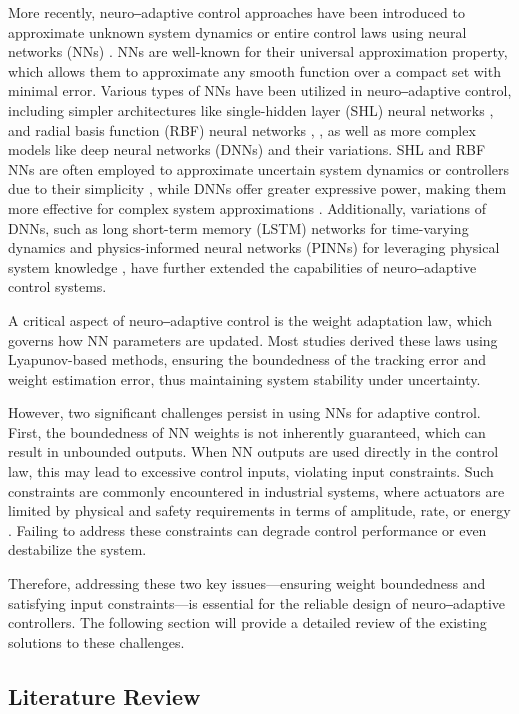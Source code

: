 \documentclass[lettersize,journal]{IEEEtran}
\begin{document}
More recently, neuro‒adaptive control approaches have been introduced to approximate unknown system dynamics or entire control laws using neural networks (NNs) \cite{RN1}. NNs are well-known for their universal approximation property, which allows them to approximate any smooth function over a compact set with minimal error. Various types of NNs have been utilized in neuro‒adaptive control, including simpler architectures like single-hidden layer (SHL) neural networks \cite{RN29}, \cite{RN44} and radial basis function (RBF) neural networks \cite{RN26}, \cite{RN10}, as well as more complex models like deep neural networks (DNNs) \cite{RN16} and their variations. SHL and RBF NNs are often employed to approximate uncertain system dynamics or controllers due to their simplicity \cite{RN44, RN56, RN3, RN41}, while DNNs offer greater expressive power, making them more effective for complex system approximations \cite{RN25}. Additionally, variations of DNNs, such as long short-term memory (LSTM) networks for time-varying dynamics \cite{RN14} and physics-informed neural networks (PINNs) for leveraging physical system knowledge \cite{RN15}, have further extended the capabilities of neuro‒adaptive control systems.

A critical aspect of neuro‒adaptive control is the weight adaptation law, which governs how NN parameters are updated. Most studies derived these laws using Lyapunov-based methods, ensuring the boundedness of the tracking error and weight estimation error, thus maintaining system stability under uncertainty.

However, two significant challenges persist in using NNs for adaptive control. First, the boundedness of NN weights is not inherently guaranteed, which can result in unbounded outputs. When NN outputs are used directly in the control law, this may lead to excessive control inputs, violating input constraints. Such constraints are commonly encountered in industrial systems, where actuators are limited by physical and safety requirements in terms of amplitude, rate, or energy \cite{RN18}. Failing to address these constraints can degrade control performance or even destabilize the system.

Therefore, addressing these two key issues—ensuring weight boundedness and satisfying input constraints—is essential for the reliable design of neuro‒adaptive controllers. The following section will provide a detailed review of the existing solutions to these challenges.

\subsection{Literature Review}
\end{document}
